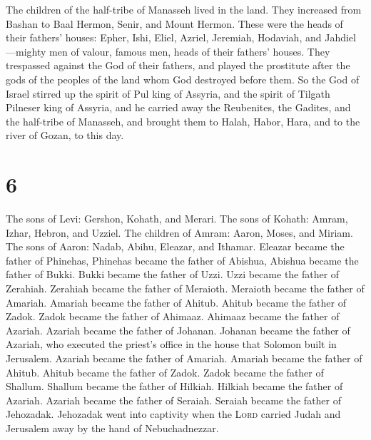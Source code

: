  The children of the half-tribe of Manasseh lived in the
land. They increased from Bashan to Baal Hermon, Senir, and Mount
Hermon.  These were the heads of their fathers' houses:
Epher, Ishi, Eliel, Azriel, Jeremiah, Hodaviah, and Jahdiel---mighty men
of valour, famous men, heads of their fathers' houses. 
They trespassed against the God of their fathers, and played the
prostitute after the gods of the peoples of the land whom God destroyed
before them.  So the God of Israel stirred up the spirit
of Pul king of Assyria, and the spirit of Tilgath Pilneser king of
Assyria, and he carried away the Reubenites, the Gadites, and the
half-tribe of Manasseh, and brought them to Halah, Habor, Hara, and to
the river of Gozan, to this day.

\hypertarget{section-5}{%
\section{6}\label{section-5}}

 The sons of Levi: Gershon, Kohath, and Merari.
 The sons of Kohath: Amram, Izhar, Hebron, and Uzziel.
 The children of Amram: Aaron, Moses, and Miriam. The sons
of Aaron: Nadab, Abihu, Eleazar, and Ithamar.  Eleazar
became the father of Phinehas, Phinehas became the father of Abishua,
 Abishua became the father of Bukki. Bukki became the
father of Uzzi.  Uzzi became the father of Zerahiah.
Zerahiah became the father of Meraioth.  Meraioth became
the father of Amariah. Amariah became the father of Ahitub.
 Ahitub became the father of Zadok. Zadok became the
father of Ahimaaz.  Ahimaaz became the father of Azariah.
Azariah became the father of Johanan.  Johanan became the
father of Azariah, who executed the priest's office in the house that
Solomon built in Jerusalem.  Azariah became the father of
Amariah. Amariah became the father of Ahitub.  Ahitub
became the father of Zadok. Zadok became the father of Shallum.
 Shallum became the father of Hilkiah. Hilkiah became the
father of Azariah.  Azariah became the father of Seraiah.
Seraiah became the father of Jehozadak.  Jehozadak went
into captivity when the \textsc{Lord} carried Judah and Jerusalem away
by the hand of Nebuchadnezzar.


